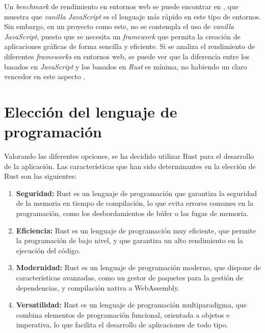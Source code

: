 Un \textit{benchmark} de rendimiento en entornos web se puede encontrar en \autocite{InteractiveResults}, que muestra que \textit{vanilla JavaScript} es el lenguaje más rápido en este tipo de entornos. Sin embargo, en un proyecto como este, no se contempla el uso de \textit{vanilla JavaScript}, puesto que se necesita un \textit{framework} que permita la creación de aplicaciones gráficas de forma sencilla y eficiente. Si se analiza el rendimiento de diferentes \textit{frameworks} en entornos web, se puede ver que la diferencia entre los basados en \textit{JavaScript} y los basados en \textit{Rust} es mínima, no habiendo un claro vencedor en este aspecto \autocite{InteractiveResults}.

\section{Elección del lenguaje de programación}

\noindent Valorando las diferentes opciones, se ha decidido utilizar Rust para el desarrollo de la aplicación. Las características que han sido determinantes en la elección de Rust son las siguientes:

\begin{enumerate}
    \item \textbf{Seguridad:} Rust es un lenguaje de programación que garantiza la seguridad de la memoria en tiempo de compilación, lo que evita errores comunes en la programación, como los desbordamientos de búfer o las fugas de memoria.
    \item \textbf{Eficiencia:} Rust es un lenguaje de programación muy eficiente, que permite la programación de bajo nivel, y que garantiza un alto rendimiento en la ejecución del código.
    \item \textbf{Modernidad:} Rust es un lenguaje de programación moderno, que dispone de características avanzadas, como un gestor de paquetes para la gestión de dependencias, y compilación nativa a WebAssembly.
    \item \textbf{Versatilidad:} Rust es un lenguaje de programación multiparadigma, que combina elementos de programación funcional, orientada a objetos e imperativa, lo que facilita el desarrollo de aplicaciones de todo tipo.
\end{enumerate}

